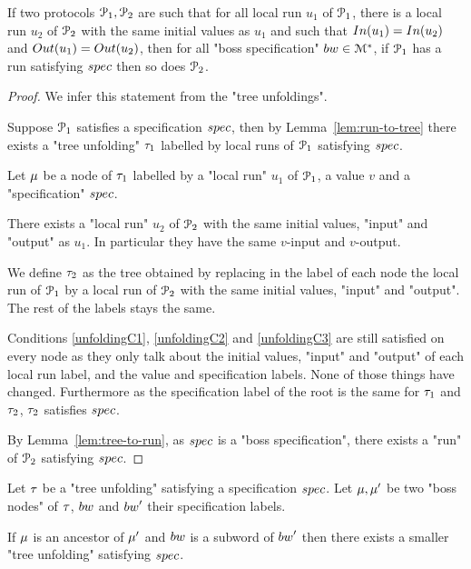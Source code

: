 \begin{lemma}
	\label{lem:local-to-global}
	If two protocols $\mathcal{P}_1, \mathcal{P}_2$ are such that for all local run $u_1$ of $\mathcal{P}_1$, there is a local run $u_2$ of $\mathcal{P}_2$ with the same initial values as $u_1$ and such that $\Input{u_1} = \Input{u_2}$ and $\Output{u_1} = \Output{u_2}$, then for all "boss specification" $bw \in \mathcal{M}^*$, if $\mathcal{P}_1$ has a run satisfying $\spec$ then so does $\mathcal{P}_2$.
\end{lemma}
\ifproofs
\begin{proof}
	We infer this statement from the "tree unfoldings".
	
	Suppose $\mathcal{P}_1$ satisfies a specification $\spec$, then by Lemma~\ref{lem:run-to-tree} there exists a "tree unfolding" $\tau_1$ labelled by local runs of $\mathcal{P}_1$ satisfying $\spec$. 
	
	Let $\mu$ be a node of $\tau_1$ labelled by a "local run" $u_1$ of $\mathcal{P}_1$, a value $v$ and a "specification" $\spec$.  
	
	There exists a "local run" $u_2$ of $\mathcal{P}_2$ with the same initial values, "input" and "output" as $u_1$. In particular they have the same $v$-input and $v$-output.
	
	We define $\tau_2$ as the tree obtained by replacing in the label of each node the local run of $\mathcal{P}_1$ by a local run of $\mathcal{P}_2$ with the same initial values, "input" and "output". The rest of the labels stays the same.
	
	Conditions \ref{unfoldingC1}, \ref{unfoldingC2} and \ref{unfoldingC3} are still satisfied on every node as they only talk about the initial values, "input" and "output" of each local run label, and the value and specification labels. None of those things have changed.
	Furthermore as the specification label of the root is the same for $\tau_1$ and $\tau_2$, $\tau_2$ satisfies $\spec$.
	
	By Lemma~\ref{lem:tree-to-run}, as $\spec$ is a "boss specification", there exists a "run" of $\mathcal{P}_2$ satisfying $\spec$.
\end{proof}
\fi



\begin{lemma}
	Let $\tau$ be a "tree unfolding" satisfying a specification $\spec$.
	Let $\mu, \mu'$ be two "boss nodes" of $\tau$, $\bossspec$ and $\bossspec'$ their specification labels.
	
	If $\mu$ is an ancestor of $\mu'$ and $\bossspec$ is a subword of $\bossspec'$ then there exists a smaller "tree unfolding" satisfying $\spec$.  
\end{lemma}

